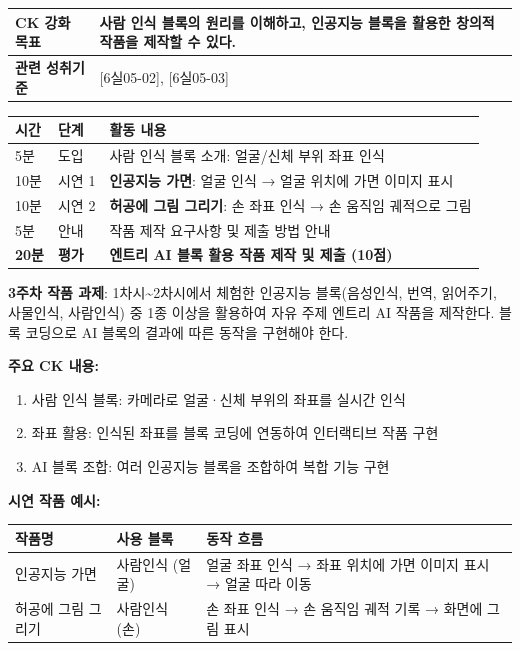\documentclass[a4paper,11pt]{article}
\begin{document}
\noindent
\begin{tabularx}{\textwidth}{|>{\bfseries\arraybackslash}p{2.5cm}|X|}
\hline
CK 강화 목표 & 사람 인식 블록의 원리를 이해하고, 인공지능 블록을 활용한 창의적 작품을 제작할 수 있다. \\ \hline
관련 성취기준 & {[6실05-02]}, {[6실05-03]} \\ \hline
\end{tabularx}

\vspace{0.3em}\noindent
\begin{tabularx}{\textwidth}{|>{\centering\arraybackslash}p{1cm}|>{\centering\arraybackslash}p{1.5cm}|X|}
\hline
\textbf{시간} & \textbf{단계} & \textbf{활동 내용} \\ \hline
5분 & 도입 & 사람 인식 블록 소개: 얼굴/신체 부위 좌표 인식 \\ \hline
10분 & 시연 1 & \textbf{인공지능 가면}: 얼굴 인식 → 얼굴 위치에 가면 이미지 표시 \\ \hline
10분 & 시연 2 & \textbf{허공에 그림 그리기}: 손 좌표 인식 → 손 움직임 궤적으로 그림 \\ \hline
5분 & 안내 & 작품 제작 요구사항 및 제출 방법 안내 \\ \hline
\textbf{20분} & \textbf{평가} & \textbf{엔트리 AI 블록 활용 작품 제작 및 제출 (10점)} \\ \hline
\end{tabularx}

\begin{quoteblock}
\textbf{3주차 작품 과제}: 1차시\textasciitilde{}2차시에서 체험한 인공지능 블록(음성인식, 번역, 읽어주기, 사물인식, 사람인식) 중 1종 이상을 활용하여 자유 주제 엔트리 AI 작품을 제작한다. 블록 코딩으로 AI 블록의 결과에 따른 동작을 구현해야 한다.
\end{quoteblock}

\textbf{주요 CK 내용:}
\begin{enumerate}[nosep,start=23]
\item 사람 인식 블록: 카메라로 얼굴·신체 부위의 좌표를 실시간 인식
\item 좌표 활용: 인식된 좌표를 블록 코딩에 연동하여 인터랙티브 작품 구현
\item AI 블록 조합: 여러 인공지능 블록을 조합하여 복합 기능 구현
\end{enumerate}

\textbf{시연 작품 예시:}

\noindent
\begin{tabularx}{\textwidth}{|p{2.8cm}|p{2.3cm}|X|}
\hline
\textbf{작품명} & \textbf{사용 블록} & \textbf{동작 흐름} \\ \hline
인공지능 가면 & 사람인식 (얼굴) & 얼굴 좌표 인식 → 좌표 위치에 가면 이미지 표시 → 얼굴 따라 이동 \\ \hline
허공에 그림 그리기 & 사람인식 (손) & 손 좌표 인식 → 손 움직임 궤적 기록 → 화면에 그림 표시 \\ \hline
\end{tabularx}
\end{document}
